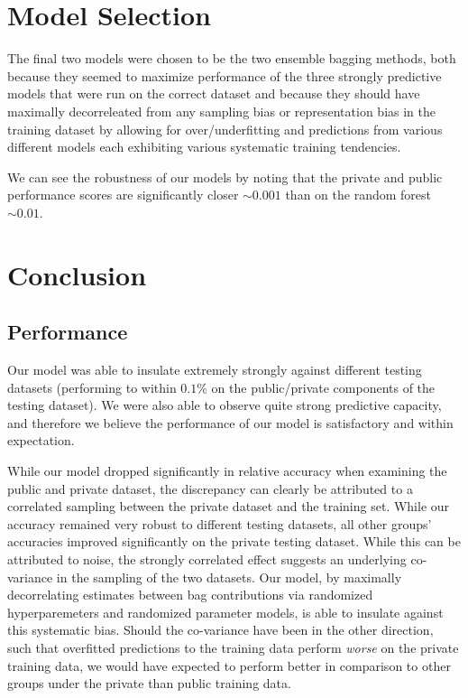 \documentclass[10pt, preprint2]{aastex}
\begin{document}
\section{Model Selection}

The final two models were chosen to be the two ensemble bagging methods, both because they seemed to maximize performance of the three strongly predictive models that were run on the correct dataset and because they should have maximally decorreleated from any sampling bias or representation bias in the training dataset by allowing for over/underfitting and predictions from various different models each exhibiting various systematic training tendencies. 

We can see the robustness of our models by noting that the private and public performance scores are significantly closer $\sim 0.001$ than on the random forest $\sim 0.01$.

\section{Conclusion}

\subsection{Performance}

Our model was able to insulate extremely strongly against different testing datasets (performing to within $0.1\%$ on the public/private components of the testing dataset). We were also able to observe quite strong predictive capacity, and therefore we believe the performance of our model is satisfactory and within expectation.

While our model dropped significantly in relative accuracy when examining the public and private dataset, the discrepancy can clearly be attributed to a correlated sampling between the private dataset and the training set. While our accuracy remained very robust to different testing datasets, all other groups' accuracies improved significantly on the private testing dataset. While this can be attributed to noise, the strongly correlated effect suggests an underlying co-variance in the sampling of the two datasets. Our model, by maximally decorrelating estimates between bag contributions via randomized hyperparemeters and randomized parameter models, is able to insulate against this systematic bias. Should the co-variance have been in the other direction, such that overfitted predictions to the training data perform \emph{worse} on the private training data, we would have expected to perform better in comparison to other groups under the private than public training data.
\end{document}
